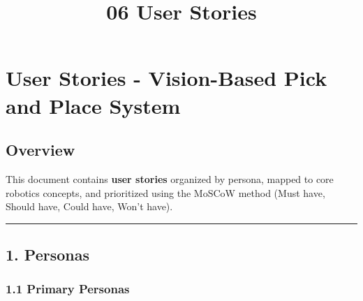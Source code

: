 \documentclass[
]{article}
\title{06 User Stories}
\author{}
\date{}
\begin{document}
\maketitle

{
\setcounter{tocdepth}{3}
\tableofcontents
}
\hypertarget{user-stories---vision-based-pick-and-place-system}{%
\section{User Stories - Vision-Based Pick and Place
System}\label{user-stories---vision-based-pick-and-place-system}}

\hypertarget{overview}{%
\subsection{Overview}\label{overview}}

This document contains \textbf{user stories} organized by persona,
mapped to core robotics concepts, and prioritized using the MoSCoW
method (Must have, Should have, Could have, Won't have).

\begin{center}\rule{0.5\linewidth}{0.5pt}\end{center}

\hypertarget{personas}{%
\subsection{1. Personas}\label{personas}}

\hypertarget{primary-personas}{%
\subsubsection{1.1 Primary Personas}\label{primary-personas}}
\end{document}
